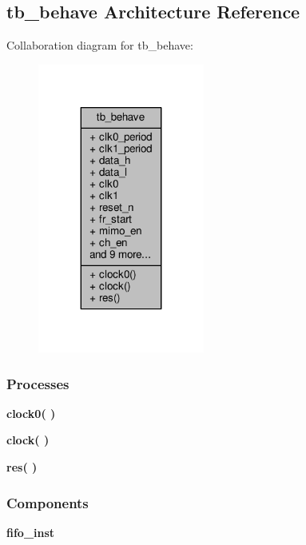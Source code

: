 \subsection{tb\+\_\+behave Architecture Reference}
\label{classwr__rx__fifo__v3tb_1_1tb__behave}


Collaboration diagram for tb\+\_\+behave\+:\nopagebreak
\begin{figure}[H]
\begin{center}
\leavevmode
\includegraphics[width=155pt]{d1/de4/classwr__rx__fifo__v3tb_1_1tb__behave__coll__graph}
\end{center}
\end{figure}
\subsubsection*{Processes}
 \begin{DoxyCompactItemize}
\item 
{\bf clock0}{\bfseries  (  )}
\item 
{\bf clock}{\bfseries  (  )}
\item 
{\bf res}{\bfseries  (  )}
\end{DoxyCompactItemize}
\subsubsection*{Components}
 \begin{DoxyCompactItemize}
\item 
{\bf fifo\+\_\+inst}  {\bfseries }  
\end{DoxyCompactItemize}
